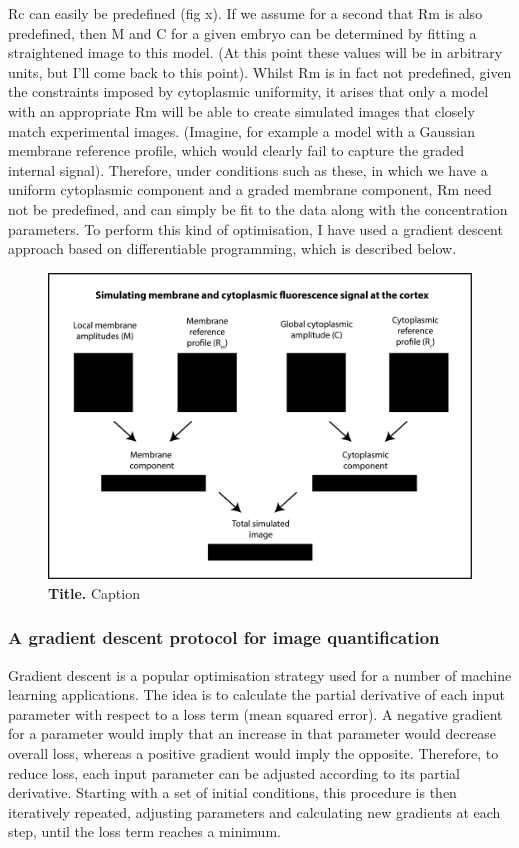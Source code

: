 \documentclass[12pt]{"article"}
\newcommand{\mycaption}[2]{\caption[#1]{\textbf{#1.} #2}}
\begin{document}
Rc can easily be predefined (fig x). If we assume for a second that Rm is also predefined, then M and C for a given embryo can be determined by fitting a straightened image to this model. (At this point these values will be in arbitrary units, but I’ll come back to this point). Whilst Rm is in fact not predefined, given the constraints imposed by cytoplasmic uniformity, it arises that only a model with an appropriate Rm will be able to create simulated images that closely match experimental images. (Imagine, for example a model with a Gaussian membrane reference profile, which would clearly fail to capture the graded internal signal). Therefore, under conditions such as these, in which we have a uniform cytoplasmic component and a graded membrane component, Rm need not be predefined, and can simply be fit to the data along with the concentration parameters. To perform this kind of optimisation, I have used a gradient descent approach based on differentiable programming, which is described below.\\

\begin{figure}[!h]
\includegraphics[scale=1.1]{memquant_model_schematic}
\setlength{\abovecaptionskip}{20pt}
\centering
\mycaption{Title}{Caption}
\label{fig:memquant_model_schematic}
\end{figure}

\subsubsection{A gradient descent protocol for image quantification}

Gradient descent is a popular optimisation strategy used for a number of machine learning applications. The idea is to calculate the partial derivative of each input parameter with respect to a loss term (mean squared error). A negative gradient for a parameter would imply that an increase in that parameter would decrease overall loss, whereas a positive gradient would imply the opposite. Therefore, to reduce loss, each input parameter can be adjusted according to its partial derivative. Starting with a set of initial conditions, this procedure is then iteratively repeated, adjusting parameters and calculating new gradients at each step, until the loss term reaches a minimum. \\
\end{document}
